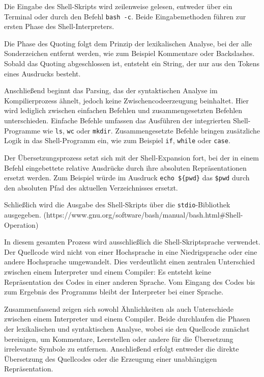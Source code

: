 Die Eingabe des Shell-Skripts wird zeilenweise gelesen, entweder über ein Terminal oder durch den Befehl \verb+bash -c+. Beide Eingabemethoden führen zur ersten Phase des Shell-Interpreters.

Die Phase des Quoting folgt dem Prinzip der lexikalischen Analyse, bei der alle Sonderzeichen entfernt werden, wie zum Beispiel Kommentare oder Backslashes. Sobald das Quoting abgeschlossen ist, entsteht ein String, der nur aus den Tokens eines Ausdrucks besteht.

Anschließend beginnt das Parsing, das der syntaktischen Analyse im Kompilierprozess ähnelt, jedoch keine Zwischencodeerzeugung beinhaltet. Hier wird lediglich zwischen einfachen Befehlen und zusammengesetzten Befehlen unterschieden. Einfache Befehle umfassen das Ausführen der integrierten Shell-Programme wie \verb+ls+, \verb+wc+ oder \verb+mkdir+. Zusammengesetzte Befehle bringen zusätzliche Logik in das Shell-Programm ein, wie zum Beispiel \verb+if+, \verb+while+ oder \verb+case+.

Der Übersetzungsprozess setzt sich mit der Shell-Expansion fort, bei der in einem Befehl eingebettete relative Ausdrücke durch ihre absoluten Repräsentationen ersetzt werden. Zum Beispiel würde im Ausdruck \verb+echo ${pwd}+ das \verb+$pwd+ durch den absoluten Pfad des aktuellen Verzeichnisses ersetzt.

Schließlich wird die Ausgabe des Shell-Skripts über die \verb+stdio+-Bibliothek ausgegeben.
(https://www.gnu.org/software/bash/manual/bash.html#Shell-Operation)

In diesem gesamten Prozess wird ausschließlich die Shell-Skriptsprache verwendet. Der Quellcode wird nicht von einer Hochsprache in eine Niedrigsprache oder eine andere Hochsprache umgewandelt. Dies verdeutlicht einen zentralen Unterschied zwischen einem Interpreter und einem Compiler: Es entsteht keine Repräsentation des Codes in einer anderen Sprache. Vom Eingang des Codes bis zum Ergebnis des Programms bleibt der Interpreter bei einer Sprache.


Zusammenfassend zeigen sich sowohl Ähnlichkeiten als auch Unterschiede zwischen einem Interpreter und einem Compiler. Beide durchlaufen die Phasen der lexikalischen und syntaktischen Analyse, wobei sie den Quellcode zunächst bereinigen, um Kommentare, Leerstellen oder andere für die Übersetzung irrelevante Symbole zu entfernen. Anschließend erfolgt entweder die direkte Übersetzung des Quellcodes oder die Erzeugung einer unabhängigen Repräsentation.

